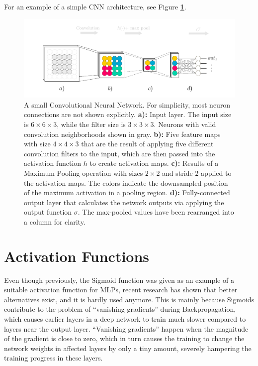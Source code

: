 For an example of a simple CNN architecture, see Figure \textbf{\ref{fig:convnet}}.

\begin {figure}[!ht]
	\begin{flushleft}
		\includegraphics[scale=0.60]{img/fig_convnet}
	\end{flushleft}
	\caption[A small Convolutional Neural Network.]{A small Convolutional Neural Network. For simplicity, most neuron connections are not shown explicitly. \textbf{a):} Input layer. The input size is $6 \times 6 \times 3$, while the filter size is $3 \times 3 \times 3$. Neurons with valid convolution neighborhoods shown in gray. \textbf{b):} Five feature maps with size $4 \times 4 \times 3$ that are the result of applying five different convolution filters to the input, which are then passed into the activation function $h$ to create activation maps. \textbf{c):} Results of a Maximum Pooling operation with sizes $2 \times 2$ and stride $2$ applied to the activation maps. The colors indicate the downsampled position of the maximum activation in a pooling region. \textbf{d):} Fully-connected output layer that calculates the network outputs via applying the output function $\sigma$. The max-pooled values have been rearranged into a column for clarity.}
	\label{fig:convnet}
\end {figure}


	\section {Activation Functions}
Even though previously, the Sigmoid function was given as an example of a suitable activation function for MLPs, recent research \cite{glorot, rectifiers} has shown that better alternatives exist, and it is hardly used anymore. This is mainly because Sigmoids contribute to the problem of ``vanishing gradients'' during Backpropagation, which causes earlier layers in a deep network to train much slower compared to layers near the output layer. ``Vanishing gradients'' happen when the magnitude of the gradient is close to zero, which in turn causes the training to change the network weights in affected layers by only a tiny amount, severely hampering the training progress in these layers.

